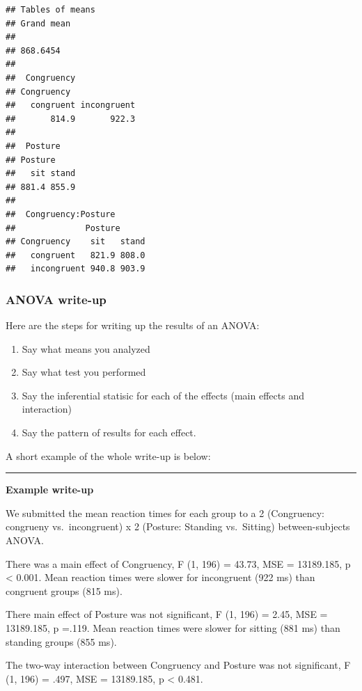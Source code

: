 \documentclass[
]{book}
\providecommand{\tightlist}{%
  \setlength{\itemsep}{0pt}\setlength{\parskip}{0pt}}
\begin{document}
\begin{verbatim}
## Tables of means
## Grand mean
##          
## 868.6454 
## 
##  Congruency 
## Congruency
##   congruent incongruent 
##       814.9       922.3 
## 
##  Posture 
## Posture
##   sit stand 
## 881.4 855.9 
## 
##  Congruency:Posture 
##              Posture
## Congruency    sit   stand
##   congruent   821.9 808.0
##   incongruent 940.8 903.9
\end{verbatim}

\hypertarget{anova-write-up}{%
\subsubsection{ANOVA write-up}\label{anova-write-up}}

Here are the steps for writing up the results of an ANOVA:

\begin{enumerate}
\def\labelenumi{\arabic{enumi}.}
\tightlist
\item
  Say what means you analyzed
\item
  Say what test you performed
\item
  Say the inferential statisic for each of the effects (main effects and interaction)
\item
  Say the pattern of results for each effect.
\end{enumerate}

A short example of the whole write-up is below:

\begin{center}\rule{0.5\linewidth}{0.5pt}\end{center}

\textbf{Example write-up}

We submitted the mean reaction times for each group to a 2 (Congruency: congrueny vs.~incongruent) x 2 (Posture: Standing vs.~Sitting) between-subjects ANOVA.

There was a main effect of Congruency, F (1, 196) = 43.73, MSE = 13189.185, p \textless{} 0.001. Mean reaction times were slower for incongruent (922 ms) than congruent groups (815 ms).

There main effect of Posture was not significant, F (1, 196) = 2.45, MSE = 13189.185, p =.119. Mean reaction times were slower for sitting (881 ms) than standing groups (855 ms).

The two-way interaction between Congruency and Posture was not significant, F (1, 196) = .497, MSE = 13189.185, p \textless{} 0.481.
\end{document}
